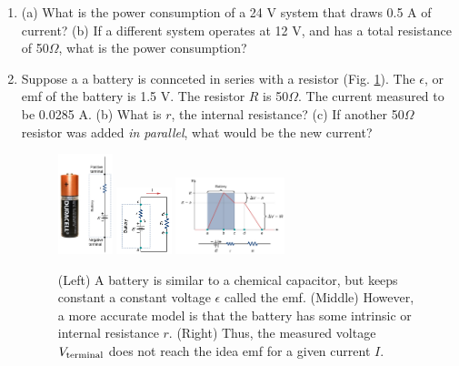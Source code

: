 \documentclass{article}
\begin{document}
\begin{enumerate}
\item (a) What is the power consumption of a 24 V system that draws 0.5 A of current? (b) If a different system operates at 12 V, and has a total resistance of 50$\Omega$, what is the power consumption? \\ \vspace{1cm}
\item Suppose a a battery is connceted in series with a resistor (Fig. \ref{fig:dura}).  The $\epsilon$, or emf of the battery is 1.5 V.  The resistor $R$ is 50$\Omega$.  The current measured to be 0.0285 A.  (b) What is $r$, the internal resistance? (c) If another 50$\Omega$ resistor was added \textit{in parallel}, what would be the new current?
\begin{figure}[ht]
\centering
\includegraphics[width=0.15\textwidth]{duracell.png}
\includegraphics[width=0.15\textwidth]{duracell2.png}
\includegraphics[width=0.3\textwidth]{duracell3.png}
\caption{\label{fig:dura} (Left) A battery is similar to a chemical capacitor, but keeps constant a constant voltage $\epsilon$ called the emf. (Middle) However, a more accurate model is that the battery has some intrinsic or internal resistance $r$.  (Right) Thus, the measured voltage $V_{\rm terminal}$ does not reach the idea emf for a given current $I$.}
\end{figure}
\end{enumerate}
\end{document}

